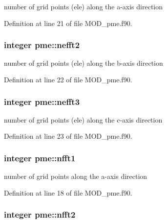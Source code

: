 number of grid points (ele) along the a-\/axis direction 



Definition at line 21 of file M\-O\-D\-\_\-pme.\-f90.

\hypertarget{classpme_a53bdcfb369bad0a725232ec54866515e}{
\subsubsection[{nefft2}]{\setlength{\rightskip}{0pt plus 5cm}integer pme\-::nefft2}}\label{classpme_a53bdcfb369bad0a725232ec54866515e}


number of grid points (ele) along the b-\/axis direction 



Definition at line 22 of file M\-O\-D\-\_\-pme.\-f90.

\hypertarget{classpme_a6ddd10f469bb8e4b9f97f365df4f4a35}{
\subsubsection[{nefft3}]{\setlength{\rightskip}{0pt plus 5cm}integer pme\-::nefft3}}\label{classpme_a6ddd10f469bb8e4b9f97f365df4f4a35}


number of grid points (ele) along the c-\/axis direction 



Definition at line 23 of file M\-O\-D\-\_\-pme.\-f90.

\hypertarget{classpme_a1bd77907007725e4328b4ab7cae55b17}{
\subsubsection[{nfft1}]{\setlength{\rightskip}{0pt plus 5cm}integer pme\-::nfft1}}\label{classpme_a1bd77907007725e4328b4ab7cae55b17}


number of grid points along the a-\/axis direction 



Definition at line 18 of file M\-O\-D\-\_\-pme.\-f90.

\hypertarget{classpme_aee11b314910706a89f58d6fb117898be}{
\subsubsection[{nfft2}]{\setlength{\rightskip}{0pt plus 5cm}integer pme\-::nfft2}}\label{classpme_aee11b314910706a89f58d6fb117898be}


